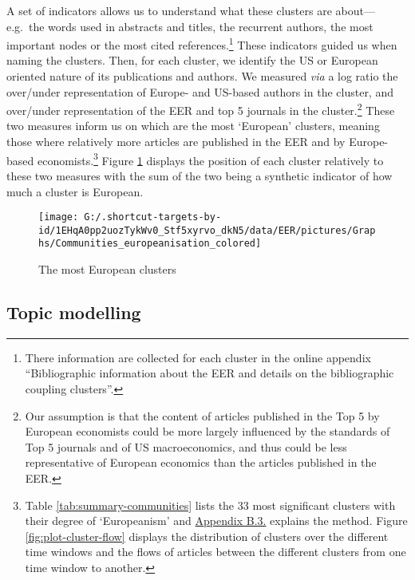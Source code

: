 \documentclass[]{elsarticle} %
\begin{document}
A set of indicators allows us to understand what these clusters are
about---e.g.~the words used in abstracts and titles, the recurrent
authors, the most important nodes or the most cited
references.\footnote{There information are collected for each cluster in
  the online appendix ``Bibliographic information about the EER and
  details on the bibliographic coupling clusters''.} These indicators
guided us when naming the clusters. Then, for each cluster, we identify
the US or European oriented nature of its publications and authors. We
measured \emph{via} a log ratio the over/under representation of Europe-
and US-based authors in the cluster, and over/under representation of
the EER and top 5 journals in the cluster.\footnote{Our assumption is
  that the content of articles published in the Top 5 by European
  economists could be more largely influenced by the standards of Top 5
  journals and of US macroeconomics, and thus could be less
  representative of European economics than the articles published in
  the EER.} These two measures inform us on which are the most
`European' clusters, meaning those where relatively more articles are
published in the EER and by Europe-based economists.\footnote{Table
  \ref{tab:summary-communities} lists the 33 most significant clusters
  with their degree of `Europeanism' and
  \protect\hyperlink{network}{Appendix B.3.} explains the method. Figure
  \ref{fig:plot-cluster-flow} displays the distribution of clusters over
  the different time windows and the flows of articles between the
  different clusters from one time window to another.} Figure
\ref{fig:plot-community-diff} displays the position of each cluster
relatively to these two measures with the sum of the two being a
synthetic indicator of how much a cluster is European.

\begin{figure}[h]

{\centering \texttt{[image: G:/.shortcut-targets-by-id/1EHqA0pp2uozTykWv0\_Stf5xyrvo\_dkN5/data/EER/pictures/Graphs/Communities\_europeanisation\_colored]} 

}

\caption{The most European clusters}\label{fig:plot-community-diff}
\end{figure}

\hypertarget{topic-modelling}{%
\subsection{Topic modelling}\label{topic-modelling}}
\end{document}
